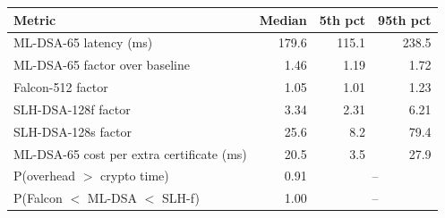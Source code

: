 \begin{tabular}{@{}lrrr@{}}\toprule
Metric & Median & 5th pct & 95th pct \\\midrule
ML-DSA-65 latency (ms) & 179.6 & 115.1 & 238.5 \\
ML-DSA-65 factor over baseline & 1.46 & 1.19 & 1.72 \\
Falcon-512 factor & 1.05 & 1.01 & 1.23 \\
SLH-DSA-128f factor & 3.34 & 2.31 & 6.21 \\
SLH-DSA-128s factor & 25.6 & 8.2 & 79.4 \\
ML-DSA-65 cost per extra certificate (ms) & 20.5 & 3.5 & 27.9 \\
P(overhead $>$ crypto time) & 0.91 & \multicolumn{2}{c}{--} \\
P(Falcon $<$ ML-DSA $<$ SLH-f) & 1.00 & \multicolumn{2}{c}{--} \\
\bottomrule\end{tabular}
